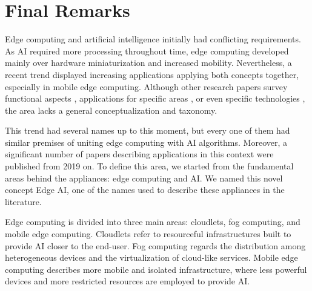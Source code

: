 

\section{Final Remarks}
\label{sec:conclusions}

Edge computing and artificial intelligence initially had conflicting requirements. As AI required more processing throughout time, edge computing developed mainly over hardware miniaturization and increased mobility. Nevertheless, a recent trend displayed increasing applications applying both concepts together, especially in mobile edge computing. Although other research papers survey functional aspects \cite{mendez2022edge}, applications for specific areas \cite{amin2020edge}, or even specific technologies \cite{lalapura2021recurrent}, the area lacks a general conceptualization and taxonomy.

This trend had several names up to this moment, but every one of them had similar premises of uniting edge computing with AI algorithms. Moreover, a significant number of papers describing applications in this context were published from 2019 on. To define this area, we started from the fundamental areas behind the appliances: edge computing and AI. We named this novel concept Edge AI, one of the names used to describe these appliances in the literature. 

Edge computing is divided into three main areas: cloudlets, fog computing, and mobile edge computing. Cloudlets refer to resourceful infrastructures built to provide AI closer to the end-user. Fog computing regards the distribution among heterogeneous devices and the virtualization of cloud-like services. Mobile edge computing describes more mobile and isolated infrastructure, where less powerful devices and more restricted resources are employed to provide AI.

